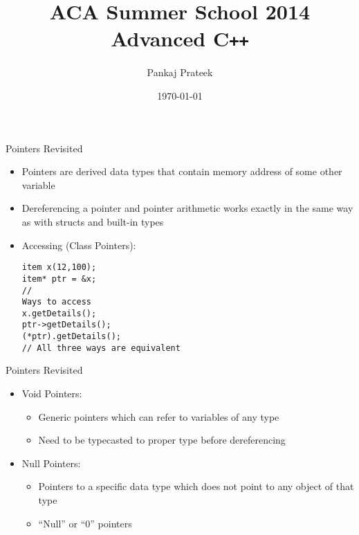 \documentclass{beamer}
\title{ACA Summer School 2014\\ Advanced C\texttt{++}}
\author{Pankaj Prateek}
\institute{ACA, CSE, IIT Kanpur}
\date{\today}
\begin{document}
\begin{frame}
  \titlepage
\end{frame}


\begin{frame}[fragile]{Pointers Revisited}
  \begin{itemize}
  \item Pointers are derived data types that contain memory address of some other variable\pause
  \item Dereferencing a pointer and pointer arithmetic works exactly in the same way as with structs and built-in types\pause
  \item Accessing (Class Pointers):
    \begin{lstlisting}
item x(12,100);
item* ptr = &x;
// 
Ways to access
x.getDetails();
ptr->getDetails();
(*ptr).getDetails();
// All three ways are equivalent
    \end{lstlisting}
  \end{itemize}
\end{frame}

\begin{frame}[fragile]{Pointers Revisited}
  \begin{itemize}
  \item Void Pointers:\pause
    \begin{itemize}
      \item Generic pointers which can refer to variables of any type\pause
      \item Need to be typecasted to proper type before dereferencing\pause
    \end{itemize}
  \item Null Pointers:\pause
    \begin{itemize}
    \item Pointers to a specific data type which does not point to any object of that type\pause
    \item ``Null'' or ``0'' pointers
    \end{itemize}
  \end{itemize}
\end{frame}
\end{document}
